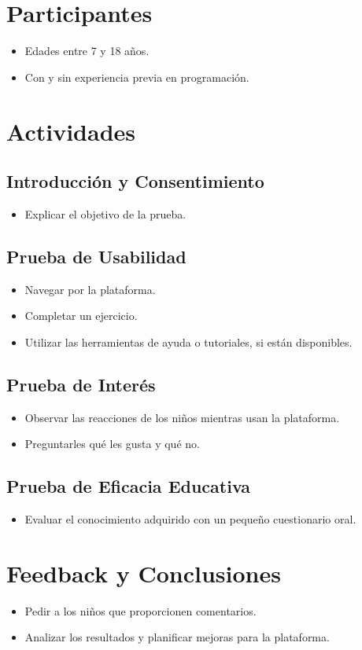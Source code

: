\begin{appendices}
\section{Participantes}
\begin{itemize}
    \item Edades entre 7 y 18 años.
    \item Con y sin experiencia previa en programación.
\end{itemize}

\section{Actividades}
\subsection*{Introducción y Consentimiento}
\begin{itemize}
    \item Explicar el objetivo de la prueba.
\end{itemize}

\subsection*{Prueba de Usabilidad}
\begin{itemize}
    \item Navegar por la plataforma.
    \item Completar un ejercicio.
    \item Utilizar las herramientas de ayuda o tutoriales, si están disponibles.
\end{itemize}

\subsection*{Prueba de Interés}
\begin{itemize}
    \item Observar las reacciones de los niños mientras usan la plataforma.
    \item Preguntarles qué les gusta y qué no.
\end{itemize}

\subsection*{Prueba de Eficacia Educativa}
\begin{itemize}
    \item Evaluar el conocimiento adquirido con un pequeño cuestionario oral.
\end{itemize}

\section{Feedback y Conclusiones}
\begin{itemize}
    \item Pedir a los niños que proporcionen comentarios.
    \item Analizar los resultados y planificar mejoras para la plataforma.
\end{itemize}

\end{appendices}
